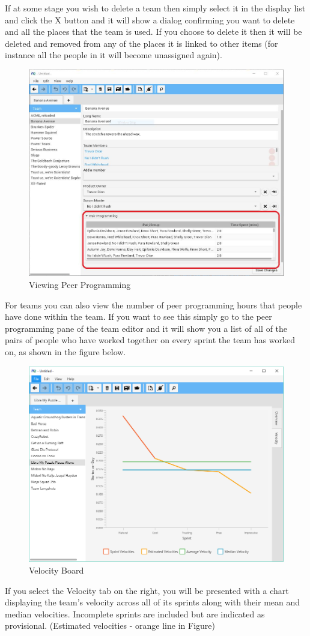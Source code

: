 If at some stage you wish to delete a team then simply select it in the display list and click the X button and it will show a dialog confirming you want to delete and all the places that the team is used. If you choose to delete it then it will be deleted and removed from any of the places it is linked to other items (for instance all the people in it will become unassigned again).

\begin{figure}[H]
	\centering
	\includegraphics[width=\textwidth]{images/screenshots/teams6.PNG}
	\caption{Viewing Peer Programming}
	\label{fig:new_project}
\end{figure}

For teams you can also view the number of peer programming hours that people have done within the team. If you want to see this simply go to the peer programming pane of the team editor and it will show you a list of all of the pairs of people who have worked together on every sprint the team has worked on, as shown in the figure below.

\begin{figure}[H]
	\centering
	\includegraphics[width=\textwidth]{images/screenshots/velocity_board.PNG}
	\caption{Velocity Board}
	\label{fig:new_project}
\end{figure}

If you select the Velocity tab on the right, you will be presented with a chart displaying the team's velocity across all of its sprints along with their mean and median velocities. Incomplete sprints are included but are indicated as provisional. (Estimated velocities - orange line in Figure)